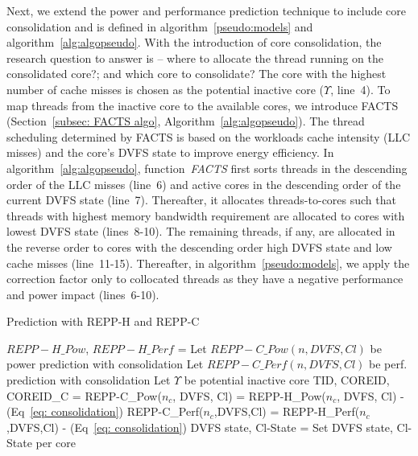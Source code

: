 Next, we extend the \muc power and performance prediction technique to include core
consolidation and is defined in algorithm~\ref{pseudo:models} and
algorithm~\ref{alg:algopseudo}.  With the introduction of core consolidation, the research
question to answer is -- where to allocate the thread running on the consolidated core?;
and which core to consolidate?  The core with the highest number of cache misses is chosen
as the potential inactive core ($\Upsilon$, line~4). To map threads from the inactive core
to the available cores, we introduce FACTS (Section~\ref{subsec: FACTS algo},
Algorithm~\ref{alg:algopseudo}). The thread scheduling determined by FACTS is based on the
workloads cache intensity (LLC misses) and the core's DVFS state to improve energy
efficiency. In algorithm~\ref{alg:algopseudo}, function~\textsl{FACTS} first sorts threads
in the descending order of the LLC misses (line~6) and active cores in the descending
order of the current DVFS state (line~7).  Thereafter, it allocates threads-to-cores such
that threads with highest memory bandwidth requirement are allocated to cores with lowest
DVFS state (lines~8-10). The remaining threads, if any, are allocated in the reverse order to
cores with the descending order high DVFS state and low cache misses (line~11-15).
Thereafter, in algorithm~\ref{pseudo:models}, we apply the correction factor only to
collocated threads as they have a negative performance and power impact (lines~6-10). 


\begin{algorithm}[t!]
    \caption{Prediction with REPP-H and REPP-C}
    \label{pseudo:models}
    \begin{algorithmic}[1]
        \State $REPP-H\_Pow$, $REPP-H\_Perf$ =  
        \State Let {\small $REPP-C\_Pow(n, DVFS, Cl)$} be power prediction with consolidation
        \State Let {\small $REPP-C\_Perf(n, DVFS, Cl)$} be perf. prediction with consolidation
        \State Let $\Upsilon$ be potential inactive core 
        \State TID, COREID, COREID\_C =   
                    \State REPP-C\_Pow($n_{c}$, DVFS, Cl)  = REPP-H\_Pow($n_{c}$, DVFS, Cl)  - (Eq~\ref{eq: consolidation})
                    \State REPP-C\_Perf($n_{c}$,DVFS,Cl) = REPP-H\_Perf($n_{c}$,DVFS,Cl) - (Eq~\ref{eq: consolidation})
                  \EndFor 
              \EndFor
          \EndFor
        \State DVFS state, Cl-State =  
        \State Set DVFS state, Cl-State per core 
    \end{algorithmic}
\end{algorithm}

